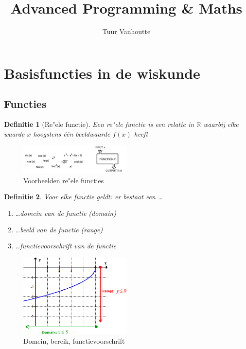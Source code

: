 \documentclass{article}
\newtheorem{theorem}{Definitie}[section]
\newenvironment{thmenum}
 {\begin{enumerate}[label=\upshape\bfseries(\roman*)]}
 {\end{enumerate}}
\begin{document}
\begin{titlepage}
    \author{Tuur Vanhoutte}
    \title{Advanced Programming \& Maths}
\end{titlepage}

\maketitle
\newpage
\tableofcontents
\newpage


\section{Basisfuncties in de wiskunde}

\subsection{Functies}

\begin{theorem}[Re"ele functie]
Een re"ele functie is een relatie in $\mathbb{R}$ waarbij elke waarde $x$ hoogstens één beeldwaarde $f(x)$ heeft
\end{theorem}

\begin{figure}[H]
    \centering
    \includegraphics[width=0.5\textwidth]{reele-functie.png}
    \caption{Voorbeelden re"ele functies}
\end{figure}

\begin{theorem}
Voor elke functie geldt: er bestaat een \dots
    \begin{thmenum}
        \item \dots domein van de functie (domain)
        \item \dots beeld van de functie (range)
        \item \dots functievoorschrift van de functie
    \end{thmenum}
\end{theorem}

\begin{figure}[H]
    \centering
    \includegraphics[width=0.5\textwidth]{functie-domain-range.png}
    \caption{Domein, bereik, functievoorschrift}
\end{figure}
\end{document}

